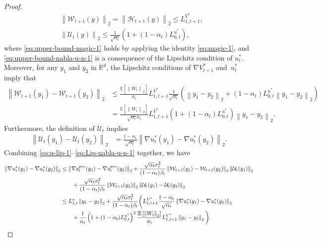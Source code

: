 \documentclass[10pt,a4paper]{amsart}
\newcommand{\R}{\mathbb{R}}
\newcommand{\bracket}[1]{\left[ #1 \right]}
\newcommand{\parenthesis}[1]{\left( #1 \right)}
\newcommand{\mcal}[1]{\mathcal{#1}}
\newcommand{\norm}[1]{\left \|#1\right \|}
\newcommand{\E}{\mathbb{E}}
\begin{document}
\begin{proof}
\begin{align}
    & \norm{\mcal{W}_{t+1}(y)}_{2} = \norm{\mcal{H}_{t+1}(y)}_2 \leq L_{1, t+1}^{V^*}, \label{eq:upper-bound-magic-1} \\ 
    & \norm{\mcal{U}_t(y)}_2 \leq \frac{1}{\sqrt{\alpha_{t}}}\parenthesis{1 + (1 - \alpha_{t})L_{0,t}^{u^{*}}}, \label{eq:upper-bound-nabla-u-n-1}
\end{align}
where \eqref{eq:upper-bound-magic-1} holds by applying the identity \eqref{eq:magic-1}, and \eqref{eq:upper-bound-nabla-u-n-1} is a consequence of the Lipschitz condition of $ u_{t}^{*} $.
Moreover, for any $ y_{1} $ and $ y_{2} $ in $\R^d$, the Lipschitz conditions of $ \nabla {V}^*_{t+1} $ and~$ u_{t}^{*} $ imply that
\begin{align}
     \norm{\mcal{W}_{t+1}(y_1) - \mcal{W}_{t+1}(y_2)}_2 \nonumber &  \leq \frac{\E\bracket{\norm{W_{t}}_2}}{\sigma_{t}}L_{1, t+1}^{{V}^*}\frac{1}{\sqrt{\alpha_{t}}}\parenthesis{\norm{y_{1} - y_{2}}_2 + (1 - \alpha_{t})L_{0, t}^{u^{*}}\norm{y_{1} - y_{2}}_2} \nonumber \\ & = \frac{\E\bracket{\norm{W_{t}}_2}}{\sqrt{\alpha_{t}}\sigma_{t}}L_{1, t+1}^{V^{*}}\parenthesis{1 + (1 - \alpha_{t})L_{0, t}^{u^{*}}}\norm{y_{1} - y_{2}}_2. \label{eq:Lip-nabla-V-w-1}
\end{align}
Furthermore, the definition of $\mcal{U}_t$ implies
\begin{align}
    \norm{\mcal{U}_t(y_1) - \mcal{U}_t(y_2)}_2 & = \frac{1 - \alpha_{t}}{\sqrt{\alpha_{t}}}\norm{\nabla u_{t}^{*}(y_{1}) - \nabla u_{t}^{*}(y_{2})}_2 \label{eq:Lip-nabla-u-n-1}.
\end{align}
Combining \eqref{eq:u-lip-1}--\eqref{eq:Lip-nabla-u-n-1} together, we have
\begin{align*}
    \norm{\nabla u_{t}^{*}(y_{1}) - \nabla u_{t}^{*}(y_{2})}_2 & \leq \norm{\nabla s_{t}^{\rm pre}(y_{1}) - \nabla s_{t}^{\rm pre}(y_{2})}_2  +  \frac{\sqrt{\alpha_{t}}\sigma_{t}^{2}}{(1 - \alpha_{t})\beta_t} \norm{\mcal{W}_{t+1}(y_1)  - \mcal{W}_{t+1}(y_2)}_2\norm{\mcal{U}_t(y_1)}_2 \\ & \qquad + \frac{\sqrt{\alpha_{t}}\sigma_{t}^{2}}{(1 - \alpha_{t})\beta_t} \norm{\mcal{W}_{t+1}(y_2)}_2\norm{\mcal{U}_t(y_1) - \mcal{U}_t(y_2)}_2 
    \\ & \leq L_{1, t}^{s}\norm{y_{1} - y_{2}}_2 + \frac{\sqrt{\alpha_{t}}\sigma_{t}^{2}}{(1 - \alpha_{t})\beta_t}\bigg(L_{1, t+1}^{V^{*}}\frac{1 - \alpha_{t}}{\sqrt{\alpha_{t}}} \norm{\nabla u_{t}^{*}(y_{1}) - \nabla u_{t}^{*}(y_{2})}_2 \\ & \qquad + \frac{1}{\alpha_{t}}\parenthesis{1 + (1 - \alpha_{t})L_{0,t}^{u^{*}}}^{2}\frac{\E\bracket{\norm{W_{t}}_2}}{\sigma_{t}}L_{1, t+1}^{V^{*}}\norm{y_{1} - y_{2}}_2\bigg).

\end{align*}
\end{proof}
\end{document}
